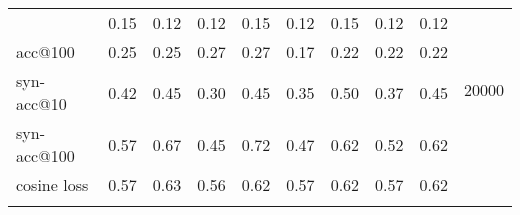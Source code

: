 \documentclass{article}
\begin{document}
\begin{table}[p]
{\begin{tabular}{l|c|c|c|c|c|c|c|c|c|}
			\hlineB{4}
			\multicolumn{1}{|l|}{acc@10}           & 0.15       & 0.12        & 0.12       & 0.15        & 0.12         & 0.15           & 0.12          & 0.12            &
			\multirow{4}{*}{20000}           \\ \cline{1-9}
			\multicolumn{1}{|l|}{acc@100}          & 0.25       & 0.25        & 0.27       & 0.27        & 0.17         & 0.22           & 0.22          & 0.22            &                                  \\ \cline{1-9}
			\multicolumn{1}{|l|}{syn-acc@10}       & 0.42       & 0.45        & 0.30       & 0.45        & 0.35         & 0.50           & 0.37          & 0.45            &                                  \\ \cline{1-9}
			\multicolumn{1}{|l|}{syn-acc@100}      & 0.57       & 0.67        & 0.45       & 0.72        & 0.47         & 0.62           & 0.52          & 0.62            &                    
			\\ \cline{1-9}
			\multicolumn{1}{|l|}{cosine loss}      & 0.57       & 0.63        & 0.56       & 0.62        & 0.57         & 0.62           & 0.57          & 0.62            &  
			\\ \hlineB{}
		\end{tabular}
	}
	\label{tab:acc-syn}
\end{table}
\end{document}
